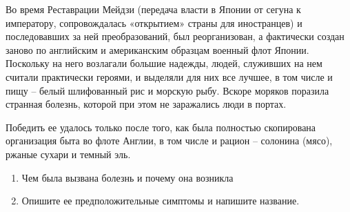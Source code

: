 
Во время Реставрации Мейдзи (передача власти в Японии от сегуна к императору, сопровождалась «открытием» страны для иностранцев) 
и последовавших за ней преобразований, был реорганизован, а фактически создан заново по английским и американским образцам 
военный флот Японии. Поскольку на него возлагали большие надежды, людей, служивших на нем считали практически героями, и 
выделяли для них все лучшее, в том числе и пищу – белый шлифованный рис и морскую рыбу. Вскоре моряков поразила странная 
болезнь, которой при этом не заражались люди в портах. 

Победить ее удалось только после того, как была полностью скопирована организация быта во флоте Англии, 
в том числе и рацион – солонина (мясо), ржаные сухари и темный эль.

\begin{enumerate}
    \item Чем была вызвана болезнь и почему она возникла
    \item Опишите ее предположительные симптомы и напишите название.
\end{enumerate}
